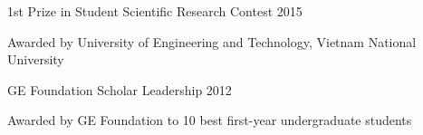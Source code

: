 \begin{cvhonors}
  \cvhonorr
    {1st Prize in Student Scientific Research Contest} %
    {2015} %
    {
    \begin{cvitems} %
        \item {Awarded by University of Engineering and Technology, Vietnam National University}
      \end{cvitems}
    }

  \cvhonorr
    {GE Foundation Scholar Leadership} %
    {2012} %
    {
    \begin{cvitems} %
        \item {Awarded by GE Foundation to 10 best first-year undergraduate students}
      \end{cvitems}
    }

\end{cvhonors}









